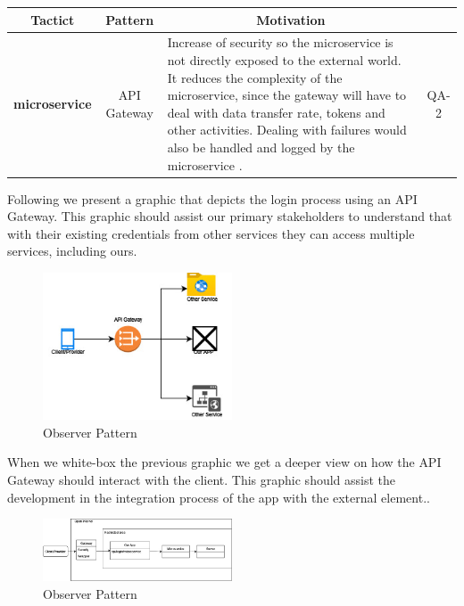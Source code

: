 \begin{table}[H]
    \begin{tabularx}{\textwidth}{|c|c|X|c|}
        \toprule
        \multicolumn{1}{c}{Tactict} & \multicolumn{1}{c}{Pattern} & \multicolumn{1}{c}{Motivation} \\
        \midrule
        \textbf{\Gls{microservice}} & \gls{API Gateway} & Increase of security so the microservice is not directly
        exposed to the external world. It reduces the complexity of the microservice, since the gateway will have to deal
        with data transfer rate, tokens and other activities. Dealing with failures would also be handled and logged
        by the microservice \cite{refonline:javtop}. & QA-2\\
        \bottomrule
    \end{tabularx}
\end{table}

Following we present a graphic that depicts the login process using an \gls{API Gateway}. This graphic should assist
our primary stakeholders to understand that with their existing credentials from other services they can access multiple 
services, including ours.

\begin{figure}[H]
    \centering
    \includegraphics[width=0.5\textwidth]{assets/simple_api_gateway.jpg}
    \caption{Observer Pattern}
    \label{fig:simple_api_gateway}
\end{figure}

When we white-box the previous graphic we get a deeper view on how the \gls{API Gateway} should interact with the 
\gls{client}. This graphic should assist the development in the integration process of the app with the external element..

\begin{figure}[H]
    \centering
    \includegraphics[width=0.5\textwidth]{assets/complex_api_gateway.jpg}
    \caption{Observer Pattern}
    \label{fig:complex_api_gateway}
\end{figure}



